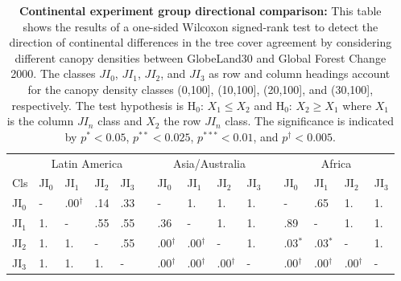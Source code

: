 			\begin{table}[ht]
				\centering
				\caption[Continental experiment group directional comparison]{\textbf{Continental experiment group directional comparison:} This table shows the results of a one-sided Wilcoxon signed-rank test to detect the direction of continental differences in the tree cover agreement by considering different canopy densities between GlobeLand30 and Global Forest Change 2000. The classes $JI_0$, $JI_1$, $JI_2$, and $JI_3$ as row and column headings account for the canopy density classes (0,100], (10,100], (20,100], and (30,100], respectively. The test hypothesis is H$_0$: $X_1\leq X_2$ and H$_0$: $X_2\geq X_1$ where $X_1$ is the column $JI_n$ class and $X_2$ the row $JI_n$ class. The significance is indicated by $p^{*}<0.05$, $p^{**}<0.025$, $p^{***}<0.01$, and $p^{\dagger}<0.005$.}
				\label{tab:wilcoxononesided_regions}
				\begin{tabular}{lllllllllllllll}
					\hline
					& \multicolumn{4}{c}{Latin America} && \multicolumn{4}{c}{Asia/Australia} && \multicolumn{4}{c}{Africa} \\\cline{2-5}\cline{7-10}\cline{12-15}
					Cls & JI$_0$ & JI$_1$ & JI$_2$ & JI$_3$ && JI$_0$ & JI$_1$ & JI$_2$ & JI$_3$ && JI$_0$ & JI$_1$ & JI$_2$ & JI$_3$ \\\hline
					JI$_0$ & - & .00$^{\dagger}$ & .14 & .33 && - & 1. & 1. & 1. && - & .65 & 1. & 1. \\
					JI$_1$ & 1. & - & .55 & .55 && .36 & - & 1. & 1. && .89 & - & 1. & 1. \\
					JI$_2$ & 1. & 1. & - & .55 && .00$^{\dagger}$ & .00$^{\dagger}$ & - & 1. && .03$^{*}$ & .03$^{*}$ & - & 1. \\
					JI$_3$ & 1. & 1. & 1. & - && .00$^{\dagger}$ & .00$^{\dagger}$ & .00$^{\dagger}$ & - && .00$^{\dagger}$ & .00$^{\dagger}$ & .00$^{\dagger}$ & - \\\hline
				\end{tabular}
			\end{table}


